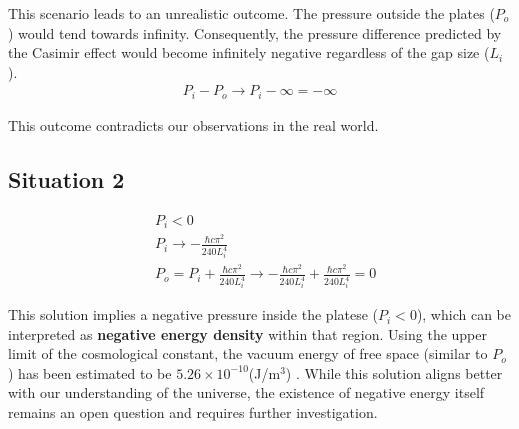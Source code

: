This scenario leads to an unrealistic outcome. The pressure outside the plates ($P_o$) would tend towards infinity.
Consequently, the pressure difference predicted by the Casimir effect would become infinitely negative regardless of the gap size ($L_i$).
\begin{align}P_i - P_o \rightarrow P_i - \infty = - \infty\end{align}

This outcome contradicts our observations in the real world.

\subsection*{Situation 2}
\begin{align}
    &P_i < 0 \\
    &P_i \rightarrow -\frac{\hbar c \pi^2}{240 L_i^4} \\
    &P_o = P_i + \frac{\hbar c \pi^2}{240 L_i^4} \rightarrow -\frac{\hbar c \pi^2}{240 L_i^4} + \frac{\hbar c \pi^2}{240 L_i^4} = 0
\end{align}

This solution implies a negative pressure inside the platese ($P_i < 0$), 
which can be interpreted as \textbf{negative energy density} within that region.
Using the upper limit of the cosmological constant, 
the vacuum energy of free space (similar to $P_o$) has been estimated to be $5.26\times10^{-10}$(J/m$^3$)  \cite{collaboration2020planck}.
While this solution aligns better with our understanding of the universe, 
the existence of negative energy itself remains an open question and requires further investigation.

